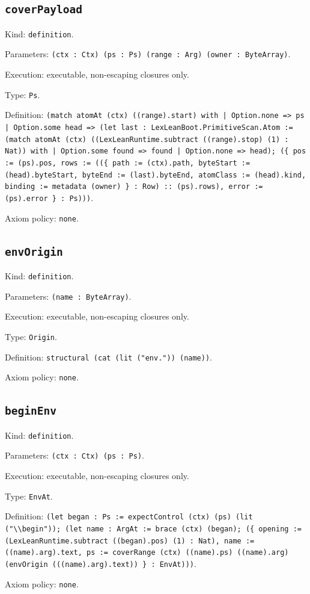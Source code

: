 \documentclass[11pt]{article}
\begin{document}
\subsection*{\texttt{coverPayload}}
\noindent Kind: \texttt{definition}.\par
\noindent Parameters: \texttt{(ctx : Ctx) (ps : Ps) (range : Arg) (owner : ByteArray)}.\par
\noindent Execution: executable, non-escaping closures only.\par
\noindent Type: \texttt{Ps}.\par
\noindent Definition: \texttt{(match atomAt (ctx) ((range).start) with | Option.none => ps | Option.some head => (let last : LexLeanBoot.PrimitiveScan.Atom := (match atomAt (ctx) ((LexLeanRuntime.subtract ((range).stop) (1) : Nat)) with | Option.some found => found | Option.none => head); (\{ pos := (ps).pos, rows := ((\{ path := (ctx).path, byteStart := (head).byteStart, byteEnd := (last).byteEnd, atomClass := (head).kind, binding := metadata (owner) \} : Row) :: (ps).rows), error := (ps).error \} : Ps)))}.\par
\noindent Axiom policy: \texttt{none}.\par
\subsection*{\texttt{envOrigin}}
\noindent Kind: \texttt{definition}.\par
\noindent Parameters: \texttt{(name : ByteArray)}.\par
\noindent Execution: executable, non-escaping closures only.\par
\noindent Type: \texttt{Origin}.\par
\noindent Definition: \texttt{structural (cat (lit ("env.")) (name))}.\par
\noindent Axiom policy: \texttt{none}.\par
\subsection*{\texttt{beginEnv}}
\noindent Kind: \texttt{definition}.\par
\noindent Parameters: \texttt{(ctx : Ctx) (ps : Ps)}.\par
\noindent Execution: executable, non-escaping closures only.\par
\noindent Type: \texttt{EnvAt}.\par
\noindent Definition: \texttt{(let began : Ps := expectControl (ctx) (ps) (lit ("\textbackslash{}\textbackslash{}begin")); (let name : ArgAt := brace (ctx) (began); (\{ opening := (LexLeanRuntime.subtract ((began).pos) (1) : Nat), name := ((name).arg).text, ps := coverRange (ctx) ((name).ps) ((name).arg) (envOrigin (((name).arg).text)) \} : EnvAt)))}.\par
\noindent Axiom policy: \texttt{none}.\par
\end{document}
